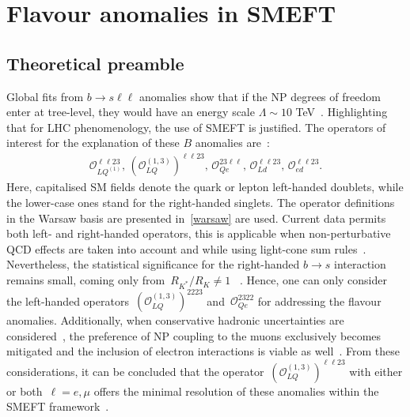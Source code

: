 \section{Flavour anomalies in SMEFT }
\label{sec:theory}
\subsection{Theoretical preamble}
Global fits from $ b \to s \ell \ell$ anomalies show that if the NP degrees of freedom enter at tree-level, they would have an energy scale $ \Lambda \sim 10$ TeV~\cite{DAmico:2017mtc,Geng:2017svp,Capdevila:2017bsm,Ciuchini:2017mik,Hiller:2017bzc}. Highlighting that for LHC phenomenology, the use of SMEFT is justified.  The operators of interest for the explanation of these $B$ anomalies are~\cite{Celis:2017doq,Ciuchini:2019usw,Aebischer:2019mlg}: 
\begin{eqnarray}
	\label{eq:tree_LUV_SMEFT}
	\mathcal{O}_{LQ^{(1)}}^{\ell \ell 23}, \,	(\mathcal{O}_{LQ}^{(1,3)})^{\ell \ell 23}, \, \mathcal{O}_{Qe}^{23 \ell \ell}, \,  \mathcal{O}_{Ld}^{ \ell \ell 23}, \, \mathcal{O}_{ed}^{\ell \ell 23 }.
\end{eqnarray}
Here, capitalised SM fields denote the quark or lepton left-handed doublets, while the lower-case ones stand for the right-handed singlets.  The operator definitions in the Warsaw basis are presented in~\autoref{warsaw} are used.  Current data permits  both left- and right-handed operators, this is applicable when non-perturbative QCD effects are taken into account and while using light-cone sum rules~\cite{Ciuchini:2019usw,Alok:2019ufo,Alguero:2019ptt,Kowalska:2019ley}. Nevertheless, the statistical significance for the right-handed $b \to s$ interaction remains small, coming only from~$R_{K^{*}}/R_{K} \neq 1$ ~\cite{Hiller:2017bzc,Ciuchini:2019usw}. Hence, one can only consider the left-handed operators~$(	\mathcal{O}_{LQ}^{(1,3)} )^{22 23}$ and~$\mathcal{O}_{Qe}^{23 22}$ for addressing the flavour anomalies. Additionally, when conservative hadronic uncertainties are considered~\cite{Jager:2014rwa,Ciuchini:2015qxb,Arbey:2018ics}, the preference of NP coupling to the muons exclusively becomes mitigated and the inclusion of electron interactions is viable as well~\cite{Ciuchini:2017mik}. From these considerations, it can be concluded that the operator~$(\mathcal{O}_{LQ}^{(1,3)} )^{\ell \ell 23}$ with either or both~$ \ell=e, \mu$  offers the minimal resolution of these anomalies within the SMEFT framework~\cite{Ciuchini:2019usw}.\\
